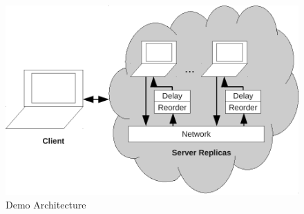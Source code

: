\begin{figure}[t]
\centering
\includegraphics[width=0.9\linewidth]{fig/demoarch.pdf}
\caption{Demo Architecture}
\label{fig:demoarch}
\end{figure}


